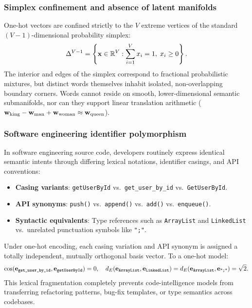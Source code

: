\documentclass[../../main.tex]{subfiles}
\begin{document}
\subsubsection{Simplex confinement and absence of latent manifolds}
One-hot vectors are confined strictly to the $V$ extreme vertices of the standard $(V-1)$-dimensional probability simplex:
\begin{equation}
\label{eq:standard_simplex}
\Delta^{V-1} = \left\{ \mathbf{x} \in \mathbb{R}^V : \sum_{i=1}^V x_i = 1, \; x_i \ge 0 \right\}.
\end{equation}
The interior and edges of the simplex correspond to fractional probabilistic mixtures, but distinct words themselves inhabit isolated, non-overlapping boundary corners. Words cannot reside on smooth, lower-dimensional semantic submanifolds, nor can they support linear translation arithmetic ($\mathbf{w}_{\text{king}} - \mathbf{w}_{\text{man}} + \mathbf{w}_{\text{woman}} \approx \mathbf{w}_{\text{queen}}$).

\subsubsection{Software engineering identifier polymorphism}
In software engineering source code, developers routinely express identical semantic intents through differing lexical notations, identifier casings, and API conventions:
\begin{itemize}
    \item \textbf{Casing variants}: \texttt{getUserById} vs.~\texttt{get\_user\_by\_id} vs.~\texttt{GetUserById}.
    \item \textbf{API synonyms}: \texttt{push()} vs.~\texttt{append()} vs.~\texttt{add()} vs.~\texttt{enqueue()}.
    \item \textbf{Syntactic equivalents}: Type references such as \texttt{ArrayList} and \texttt{LinkedList} vs.~unrelated punctuation symbols like \texttt{";"}.
\end{itemize}
Under one-hot encoding, each casing variation and API synonym is assigned a totally independent, mutually orthogonal basis vector. To a one-hot model:
\begin{equation}
\label{eq:code_syntax_equidistance}
\cos(\mathbf{e}_{\text{\texttt{get\_user\_by\_id}}}, \mathbf{e}_{\text{\texttt{getUserById}}}) = 0, \quad d_E(\mathbf{e}_{\text{\texttt{ArrayList}}}, \mathbf{e}_{\text{\texttt{LinkedList}}}) = d_E(\mathbf{e}_{\text{\texttt{ArrayList}}}, \mathbf{e}_{\text{\texttt{";"}}}) = \sqrt{2}.
\end{equation}
This lexical fragmentation completely prevents code-intelligence models from transferring refactoring patterns, bug-fix templates, or type semantics across codebases.
\end{document}
